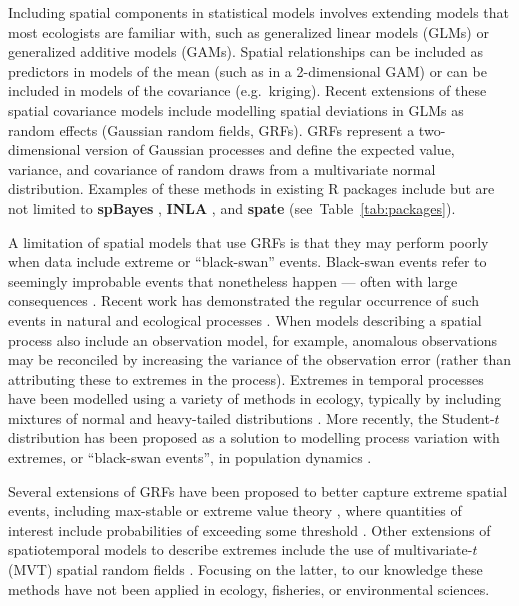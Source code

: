 \documentclass[12pt,english]{article}
\newcommand{\R}[1]{\label{#1}\linelabel{#1}}
\begin{document}
\begin{spacing}{1.8}
Including spatial components in statistical models involves extending models
that most ecologists are familiar with, such as generalized linear
models (GLMs) or generalized additive models (GAMs). Spatial relationships can
be included as predictors in models of the mean (such as in a 2-dimensional GAM)
or can be included in models of the covariance (e.g.\ kriging). Recent
extensions of these spatial covariance models include modelling spatial
deviations in GLMs as random effects (Gaussian random fields, GRFs).
GRFs represent a two-dimensional version of Gaussian
processes and define the expected value, variance, and covariance of
random draws from a multivariate normal distribution.\R{B6}
Examples of these methods in existing R packages include but are not limited to
\textbf{spBayes} \citep{finley2007}, \textbf{INLA} \citep{rue2009}, and
\textbf{spate} \citep{sigrist2015} (see~Table~\ref{tab:packages}).

A limitation of spatial models that use GRFs is that they may perform poorly
when data include extreme or ``black-swan'' events. Black-swan events refer to
seemingly improbable events that nonetheless happen --- often with large
consequences \citep{taleb2007}.
Recent work has demonstrated the regular occurrence of such events in natural
and ecological processes \citep[e.g.][]{albeverio2006, ward2007, fey2015, anderson2017}.\R{B7}
When models describing a spatial process
also include an observation model, for example, anomalous observations may be
reconciled by increasing the variance of the observation error (rather than
attributing these to extremes in the process). Extremes in temporal processes
have been modelled using a variety of methods in ecology, typically by including
mixtures of normal and heavy-tailed distributions \citep[e.g.][]{everitt1996,
  ward2007, thorson2011}. More recently, the Student-$t$ distribution has been
proposed as a solution to modelling process variation with extremes, or
``black-swan events'', in population dynamics \citep{anderson2017}.

Several extensions of GRFs have been proposed to better capture extreme spatial
events, including max-stable or extreme value theory \citep{davison2012,
  davison2012a}, where quantities of interest include probabilities of exceeding
some threshold \citep{davis2008}. Other extensions of spatiotemporal models to
describe extremes include the use of multivariate-$t$ (MVT) spatial random
fields \citep{roislien2007}. Focusing on the latter, to our knowledge these
methods have not been applied in ecology, fisheries, or environmental sciences.


\end{spacing}
\end{document}
